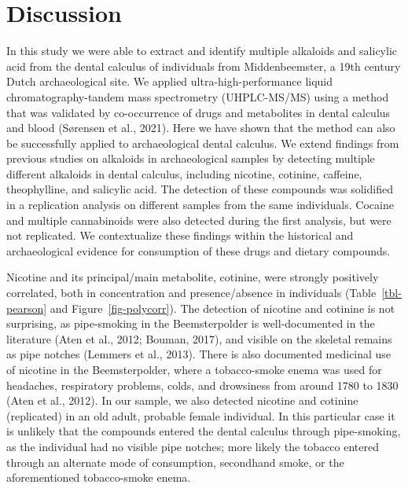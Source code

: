 \documentclass[
]{article}
\begin{document}
\hypertarget{discussion}{%
\section{Discussion}\label{discussion}}

In this study we were able to extract and identify multiple alkaloids
and salicylic acid from the dental calculus of individuals from
Middenbeemster, a 19th century Dutch archaeological site. We applied
ultra-high-performance liquid chromatography-tandem mass spectrometry
(UHPLC-MS/MS) using a method that was validated by co-occurrence of
drugs and metabolites in dental calculus and blood (Sørensen et al.,
2021). Here we have shown that the method can also be successfully
applied to archaeological dental calculus. We extend findings from
previous studies on alkaloids in archaeological samples by detecting
multiple different alkaloids in dental calculus, including nicotine,
cotinine, caffeine, theophylline, and salicylic acid. The detection of
these compounds was solidified in a replication analysis on different
samples from the same individuals. Cocaine and multiple cannabinoids
were also detected during the first analysis, but were not replicated.
We contextualize these findings within the historical and archaeological
evidence for consumption of these drugs and dietary compounds.

Nicotine and its principal/main metabolite, cotinine, were strongly
positively correlated, both in concentration and presence/absence in
individuals (Table~\ref{tbl-pearson} and Figure~\ref{fig-polycorr}). The
detection of nicotine and cotinine is not surprising, as pipe-smoking in
the Beemsterpolder is well-documented in the literature (Aten et al.,
2012; Bouman, 2017), and visible on the skeletal remains as pipe notches
(Lemmers et al., 2013). There is also documented medicinal use of
nicotine in the Beemsterpolder, where a tobacco-smoke enema was used for
headaches, respiratory problems, colds, and drowsiness from around 1780
to 1830 (Aten et al., 2012). In our sample, we also detected nicotine
and cotinine (replicated) in an old adult, probable female individual.
In this particular case it is unlikely that the compounds entered the
dental calculus through pipe-smoking, as the individual had no visible
pipe notches; more likely the tobacco entered through an alternate mode
of consumption, secondhand smoke, or the aforementioned tobacco-smoke
enema.
\end{document}
